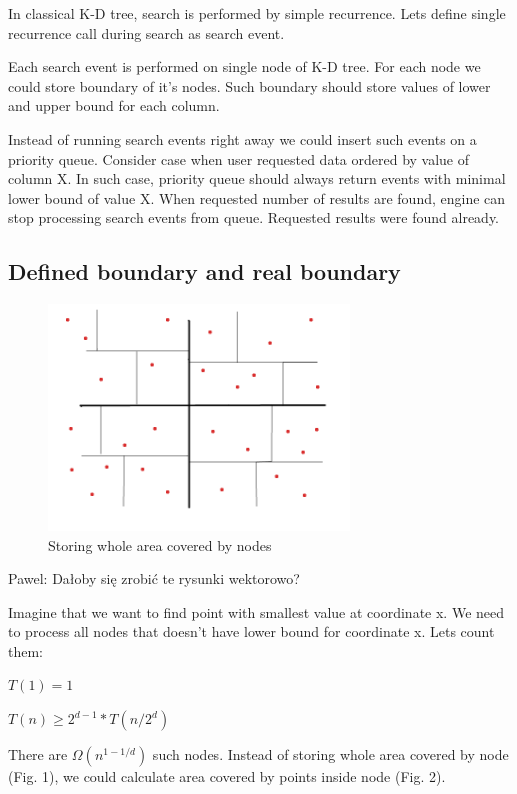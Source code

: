\documentclass[10pt,a4paper]{article}
\newcommand{\pawel}[1]{\noindent\colorbox{myRed}{Pawel: #1}}
\begin{document}
In classical K-D tree, search is performed by simple recurrence. Lets define single recurrence call during search as search event.

Each search event is performed on single node of K-D tree. For each node we could store boundary of it's nodes. Such boundary should store values of lower and upper bound for each column.

Instead of running search events right away we could insert such events on a priority queue. Consider case when user requested data ordered by value of column X. In such case, priority queue should always return events with minimal lower bound of value X. When requested number of results are found, engine can stop processing search events from queue. Requested results were found already.

\subsection{Defined boundary and real boundary}

\begin{figure}
\centering
  \includegraphics[width=8cm]{simple_boundary.png}%
  \caption{Storing whole area covered by nodes}
\end{figure}
\pawel{Dałoby się zrobić te rysunki wektorowo?}

Imagine that we want to find point with smallest value at coordinate x. We need to process all nodes
that doesn't have lower bound for coordinate x. Lets count them:
\bigskip

$T(1) = 1$

$T(n) \geq 2^{d-1} * T(n/2^{d})$

\bigskip

There are $\Omega (n^{1-1/d})$ such nodes. Instead of storing whole area covered by node (Fig. 1), we could calculate area covered by points inside node (Fig. 2).
\end{document}
